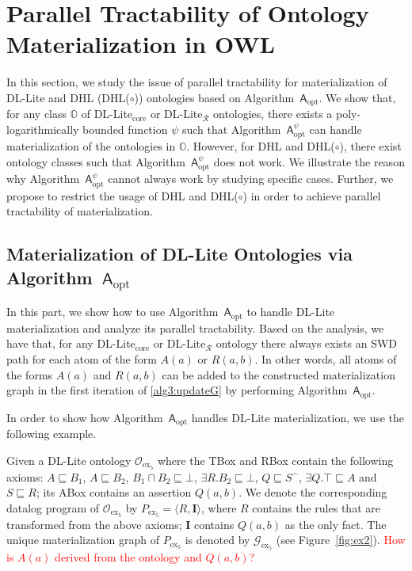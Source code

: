 \section{Parallel Tractability of Ontology Materialization in OWL}
\label{sec:ptonto}

In this section, we study the issue of parallel tractability
for materialization of DL-Lite and DHL (DHL($\circ$)) ontologies
based on Algorithm~$\mathsf{A}_{\text{opt}}$. We show that, for any class $\mathbb{O}$ of
DL-Lite$_{\text{core}}$ or DL-Lite$_\mathcal{R}$ ontologies,
there exists a poly-logarithmically bounded function $\psi$
such that Algorithm~$\mathsf{A}_{\text{opt}}^{\psi}$ can handle materialization of the ontologies in $\mathbb{O}$.
However, for DHL and DHL($\circ$), there exist ontology classes such that Algorithm~$\mathsf{A}_{\text{opt}}^\psi$
does not work. We illustrate the reason why Algorithm~$\mathsf{A}_{\text{opt}}^\psi$ cannot always
work by studying specific cases.
Further, we propose to restrict the usage of DHL and DHL($\circ$) in order to achieve parallel tractability
of materialization.

\subsection{Materialization of DL-Lite Ontologies via Algorithm~$\mathsf{A}_{\text{opt}}$}

In this part, we show how to use Algorithm~$\mathsf{A}_{\text{opt}}$ to handle
DL-Lite materialization and analyze its parallel tractability.
Based on the analysis, we have that, for any DL-Lite$_{\text{core}}$ or DL-Lite$_\mathcal{R}$ ontology
there always exists an SWD path for each atom of the form $A(a)$ or $R(a,b)$.
In other words, all atoms of the forms $A(a)$ and $R(a,b)$ can be added to
the constructed materialization graph in the first iteration of \ref{alg3:updateG}
by performing Algorithm~$\mathsf{A}_{\text{opt}}$.

In order to show how Algorithm~$\mathsf{A}_{\text{opt}}$ handles DL-Lite materialization,
we use the following example.

\begin{example}\label{exp:dllite}
Given a DL-Lite ontology $\mathcal{O}_{\text{ex}_5}$
where the TBox and RBox contain the following axioms:
$A\sqsubseteq B_1$, $A\sqsubseteq B_2$, $B_1\sqcap B_2\sqsubseteq\bot$,
$\exists R.B_2\sqsubseteq\bot$, $Q\sqsubseteq S^-$, $\exists Q.\top\sqsubseteq A$ and $S\sqsubseteq R$;
its ABox contains an assertion $Q(a,b)$.
We denote the corresponding datalog program of $\mathcal{O}_{\text{ex}_5}$ by $P_{\text{ex}_5}=\langle R, \textbf{I}\rangle$,
where $R$ contains the rules that are transformed from the above axioms; $\textbf{I}$ contains $Q(a,b)$
as the only fact.
The unique materialization graph of $P_{\text{ex}_5}$ is denoted by
$\mathcal{G}_{\text{ex}_5}$ (see
Figure~\ref{fig:ex2}). \textcolor{red}{How is $A(a)$ derived from the
  ontology and $Q(a, b)$?}
\end{example}

